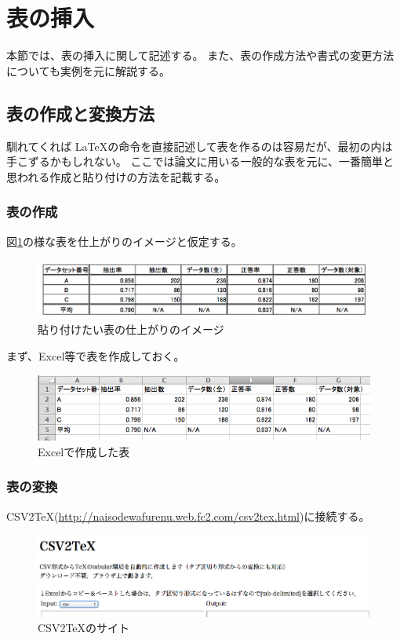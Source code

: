 \section{表の挿入}
本節では、表の挿入に関して記述する。
また、表の作成方法や書式の変更方法についても実例を元に解説する。

\subsection{表の作成と変換方法}
馴れてくれば \LaTeX の命令を直接記述して表を作るのは容易だが、最初の内は手こずるかもしれない。
ここでは論文に用いる一般的な表を元に、一番簡単と思われる作成と貼り付けの方法を記載する。

\subsubsection{表の作成}
図\ref{fig:tableFinish}の様な表を仕上がりのイメージと仮定する。
\begin{figure}[H]
\centering
\includegraphics[width=14cm]{tableFinishImage.png}
\vspace{-3mm}
\caption{貼り付けたい表の仕上がりのイメージ}
\label{fig:tableFinish}
\end{figure}

まず、Excel等で表を作成しておく。
\begin{figure}[H]
\centering
\includegraphics[width=14cm]{excelTable.png}
\vspace{-3mm}
\caption{Excelで作成した表}
\label{fig:excelTable}
\end{figure}

\subsubsection{表の変換}
CSV2TeX(\url{http://naisodewafurenu.web.fc2.com/csv2tex.html})に接続する。
\begin{figure}[H]
\centering
\includegraphics[width=12cm]{csv2tex.png}
\vspace{-3mm}
\caption{CSV2TeXのサイト}
\label{fig:csv2tex}
\end{figure}

